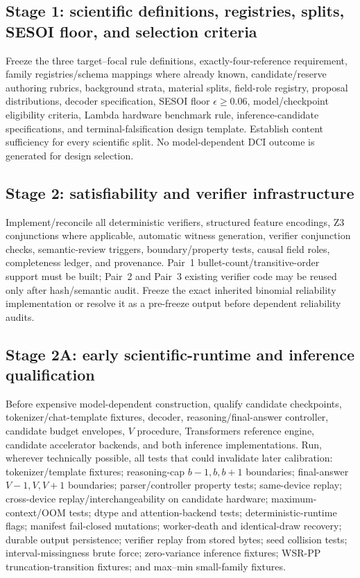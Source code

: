\documentclass[11pt,a4paper]{article}
\begin{document}
\subsection{Stage 1: scientific definitions, registries, splits, SESOI floor, and selection criteria}
Freeze the three target--focal rule definitions, exactly-four-reference requirement, family registries/schema mappings where already known, candidate/reserve authoring rubrics, background strata, material splits, field-role registry, proposal distributions, decoder specification, SESOI floor $\epsilon\ge0.06$, model/checkpoint eligibility criteria, Lambda hardware benchmark rule, inference-candidate specifications, and terminal-falsification design template. Establish content sufficiency for every scientific split. No model-dependent DCI outcome is generated for design selection.

\subsection{Stage 2: satisfiability and verifier infrastructure}
Implement/reconcile all deterministic verifiers, structured feature encodings, Z3 conjunctions where applicable, automatic witness generation, verifier conjunction checks, semantic-review triggers, boundary/property tests, causal field roles, completeness ledger, and provenance. Pair~1 bullet-count/transitive-order support must be built; Pair~2 and Pair~3 existing verifier code may be reused only after hash/semantic audit. Freeze the exact inherited binomial reliability implementation or resolve it as a pre-freeze output before dependent reliability audits.

\subsection{Stage 2A: early scientific-runtime and inference qualification}
Before expensive model-dependent construction, qualify candidate checkpoints, tokenizer/chat-template fixtures, decoder, reasoning/final-answer controller, candidate budget envelopes, $V$ procedure, Transformers reference engine, candidate accelerator backends, and both inference implementations. Run, wherever technically possible, all tests that could invalidate later calibration: tokenizer/template fixtures; reasoning-cap $b-1,b,b+1$ boundaries; final-answer $V-1,V,V+1$ boundaries; parser/controller property tests; same-device replay; cross-device replay/interchangeability on candidate hardware; maximum-context/OOM tests; dtype and attention-backend tests; deterministic-runtime flags; manifest fail-closed mutations; worker-death and identical-draw recovery; durable output persistence; verifier replay from stored bytes; seed collision tests; interval-missingness brute force; zero-variance inference fixtures; WSR-PP truncation-transition fixtures; and max--min small-family fixtures.
\end{document}
